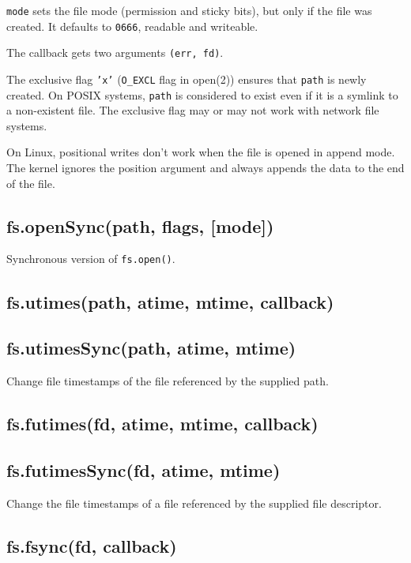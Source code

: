 \texttt{mode} sets the file mode (permission and sticky bits), but only
if the file was created. It defaults to \texttt{0666}, readable and
writeable.

The callback gets two arguments \texttt{(err, fd)}.

The exclusive flag \texttt{'x'} (\texttt{O\_EXCL} flag in open(2))
ensures that \texttt{path} is newly created. On POSIX systems,
\texttt{path} is considered to exist even if it is a symlink to a
non-existent file. The exclusive flag may or may not work with network
file systems.

On Linux, positional writes don't work when the file is opened in append
mode. The kernel ignores the position argument and always appends the
data to the end of the file.

\subsection{fs.openSync(path, flags, {[}mode{]})}

Synchronous version of \texttt{fs.open()}.

\subsection{fs.utimes(path, atime, mtime, callback)}

\subsection{fs.utimesSync(path, atime, mtime)}

Change file timestamps of the file referenced by the supplied path.

\subsection{fs.futimes(fd, atime, mtime, callback)}

\subsection{fs.futimesSync(fd, atime, mtime)}

Change the file timestamps of a file referenced by the supplied file
descriptor.

\subsection{fs.fsync(fd, callback)}

